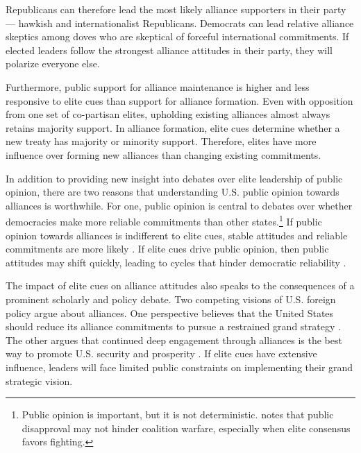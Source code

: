 \documentclass[12pt]{article}
\begin{document}
Republicans can therefore lead the most likely alliance supporters in their party--- hawkish and internationalist Republicans.
Democrats can lead relative alliance skeptics among doves who are skeptical of forceful international commitments.
If elected leaders follow the strongest alliance attitudes in their party, they will polarize everyone else. 


Furthermore, public support for alliance maintenance is higher and less responsive to elite cues than support for alliance formation.
Even with opposition from one set of co-partisan elites, upholding existing alliances almost always retains majority support. 
In alliance formation, elite cues determine whether a new treaty has majority or minority support. 
Therefore, elites have more influence over forming new alliances than changing existing commitments. 


In addition to providing new insight into debates over elite leadership of public opinion, there are two reasons that understanding U.S. public opinion towards alliances is worthwhile. 
For one, public opinion is central to debates over whether democracies make more reliable commitments than other states.\footnote{Public opinion is important, but it is not deterministic. \citet{Kreps2010} notes that public disapproval may not hinder coalition warfare, especially when elite consensus favors fighting.} 
If public opinion towards alliances is indifferent to elite cues, stable attitudes and reliable commitments are more likely \citep{Gaubatz1996}.
If elite cues drive public opinion, then public attitudes may shift quickly, leading to cycles that hinder democratic reliability \citep{GartzkeGleditsch2004}.


The impact of elite cues on alliance attitudes also speaks to the consequences of a prominent scholarly and policy debate. 
Two competing visions of U.S. foreign policy argue about alliances. 
One perspective believes that the United States should reduce its alliance commitments to pursue a restrained grand strategy \citep{Preble2009, Posen2014}.
The other argues that continued deep engagement through alliances is the best way to promote U.S. security and prosperity \citep{Brooksetal2013, BrandsFeaver2017}. 
If elite cues have extensive influence, leaders will face limited public constraints on implementing their grand strategic vision. 
\end{document}
